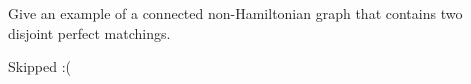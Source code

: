 \question Give an example of a connected non-Hamiltonian graph that contains two
disjoint perfect matchings.

\begin{solution}
  Skipped :(
\end{solution}
